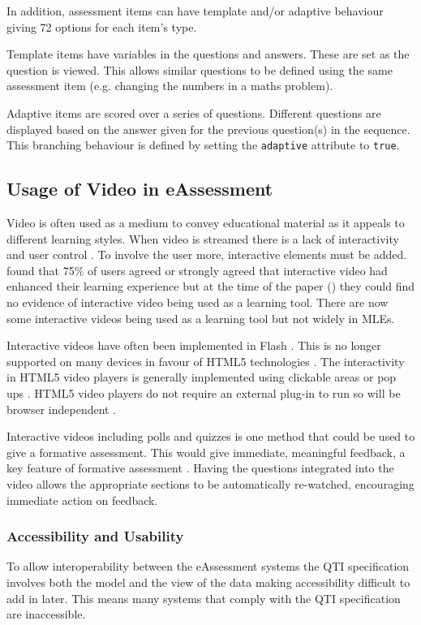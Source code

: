In addition, assessment items can have template and/or adaptive behaviour giving 72 options for each item's type. 

Template items have variables in the questions and answers. These are set as the question is viewed. This allows similar questions to be defined using the same assessment item (e.g. changing the numbers in a maths problem).

Adaptive items are scored over a series of questions. Different questions are displayed based on the answer given for the previous question(s) in the sequence. This branching behaviour is defined by setting the \lstinline!adaptive! attribute to \lstinline!true!. 

\subsection{Usage of Video in eAssessment}
\label{Subsection:Usage of Video in eAssessment}
Video is often used as a medium to convey educational material as it appeals to different learning styles. When video is streamed there is a lack of interactivity and user control \citep{eps267281, DeBoer}. To involve the user more, interactive elements must be added.  found that 75\% of users agreed or strongly agreed that interactive video had enhanced their learning experience but at the time of the paper (\citeyear{eps267281}) they could find no evidence of interactive video being used as a learning tool. There are now some interactive videos being used as a learning tool \citep{nadia} but not widely in \glspl{MLE}.

Interactive videos have often been implemented in Flash \citep{interactiveVideo, eps267281}. This is no longer supported on many devices in favour of HTML5 technologies \citep{flashDead}. The interactivity in HTML5 video players is generally implemented using clickable areas or pop ups \citep{interactiveHTML5}. HTML5 video players do not require an external plug-in to run so will be browser independent \citep{epifania2011design, interactiveHTML5}. 

Interactive videos including polls and quizzes is one method that could be used to give a formative assessment. This would give immediate, meaningful feedback, a key feature of formative assessment \citep{eps265979}. Having the questions integrated into the video allows the appropriate sections to be automatically re-watched, encouraging immediate action on feedback. 

\subsubsection{Accessibility and Usability}
\label{Subsubsection:Accessibility and Usability}
To allow interoperability between the \gls{eAssessment} systems the \gls{QTI} specification involves both the model and the view of the data \citep{wikieassessment} making accessibility difficult to add in later. This means many systems that comply with the \gls{QTI} specification are inaccessible.

